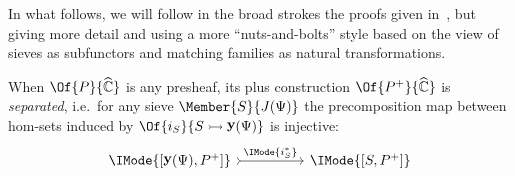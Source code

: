 \documentclass{article}
\DeclareMathOperator\OpYoneda{\mathbf{y}}
\newcommand\Yoneda[1]{\OpYoneda({#1})}
\newcommand\Psh[1]{\widehat{#1}}
\begin{document}
In what follows, we will follow in the broad strokes the proofs given
in~\cite{maclane-moerdijk:1992}, but giving more detail and using a
more ``nuts-and-bolts'' style based on the view of sieves as
subfunctors and matching families as natural transformations.

\begin{thm}\label{thm:plus-separated}
  When $\Of{P}{\Psh{\mathbb{C}}}$ is any presheaf, its plus
  construction $\Of{\Plus{P}}{\Psh{\mathbb{C}}}$ is \emph{separated},
  i.e.\ for any sieve $\Member{S}{J(\Psi)}$ the precomposition map
  between hom-sets induced by
  $\Of{i_S}{S\rightarrowtail\Yoneda{\Psi}}$ is injective:
  \[
    \begin{tikzcd}[sep=huge]
      \IMode{[\Yoneda{\Psi},\Plus{P}]}
      \arrow[r,tail,"\IMode{i_S^*}"]
      &
      \IMode{[S,\Plus{P}]}
    \end{tikzcd}
  \]
\end{thm}
\end{document}
